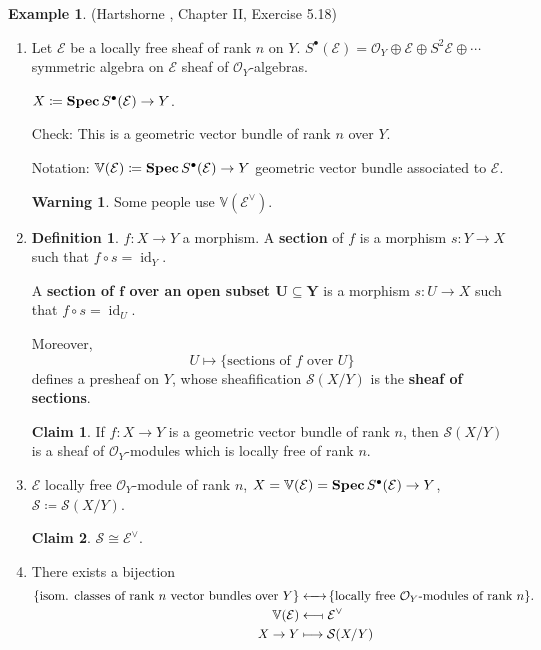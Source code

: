 \documentclass[12pt]{article}
\DeclareMathOperator{\id}{id}
\DeclareMathOperator{\relSpec}{\textnormal{\textbf{Spec}}}
\theoremstyle{definition}
\newtheorem*{definition}{Definition}
\newtheorem*{warning}{Warning}
\newtheorem*{claim}{Claim}
\newtheorem*{example}{Example}
\begin{document}
\begin{example}
(Hartshorne \cite{hartshorne2013algebraic}, Chapter II, Exercise 5.18)

\begin{enumerate}[label=\arabic*)]
\item Let $\mathcal E$ be a locally free sheaf of rank $n$ on $Y$. $S^\bullet(\mathcal E)=\mathcal O_Y\oplus\mathcal E\oplus S^2\mathcal E\oplus\cdots$ symmetric algebra on $\mathcal E$ sheaf of $\mathcal O_Y$-algebras.

$X\coloneqq\relSpec S^\bullet(\mathcal E)\rightarrow Y$.

Check: This is a geometric vector bundle of rank $n$ over $Y$.

Notation: $\mathbb V(\mathcal E)\coloneqq\relSpec S^\bullet(\mathcal E)\rightarrow Y$ geometric vector bundle associated to $\mathcal E$.

\begin{warning}
Some people use $\mathbb V(\mathcal E^\vee)$.
\end{warning}

\item
\begin{definition}
$f:X\rightarrow Y$ a morphism. A \textbf{section} of $f$ is a morphism $s:Y\rightarrow X$ such that $f\circ s=\id_Y$.

A \textbf{section of $\boldsymbol f$ over an open subset $\boldsymbol{U\subseteq Y}$} is a morphism $s:U\rightarrow X$ such that $f\circ s=\id_U$.

Moreover,
\[U\longmapsto\{\text{sections of }f\text{ over }U\}\]
defines a presheaf on $Y$, whose sheafification $\mathcal S(X/Y)$ is the \textbf{sheaf of sections}.
\end{definition}

\begin{claim}
If $f:X\rightarrow Y$ is a geometric vector bundle of rank $n$, then $\mathcal S(X/Y)$ is a sheaf of $\mathcal O_Y$-modules which is locally free of rank $n$.
\end{claim}

\item $\mathcal E$ locally free $\mathcal O_Y$-module of rank $n$, $X=\mathbb V(\mathcal E)=\relSpec S^\bullet(\mathcal E)\rightarrow Y$, $\mathcal S\coloneqq\mathcal S(X/Y)$.

\begin{claim}
$\mathcal S\cong\mathcal E^\vee$.
\end{claim}

\item There exists a bijection
\begin{align*}
\{\text{isom. classes of rank }n\text{ vector bundles over }Y\}&\xleftrightarrow{\hspace{4.4mm}}\hspace{-0.5mm}\{\text{locally free }\mathcal O_Y\text{-modules of rank }n\}.\\\mathbb V(\mathcal E)&\longleftarrow\!\shortmid\mathcal E^\vee\\X\rightarrow Y&\longmapsto\mathcal S(X/Y)
\end{align*}
\end{enumerate}
\end{example}
\end{document}
